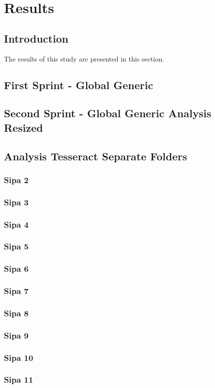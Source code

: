 \chapter{Results}
\label{chap:results}

\section{Introduction}

The results of this study are presented in this section.

\section{First Sprint - Global Generic}
\section{Second Sprint - Global Generic Analysis Resized}
\section{Analysis Tesseract Separate Folders}



\newpage

\newpage

\subsection{Sipa 2}
\subsection{Sipa 3}
\subsection{Sipa 4}
\subsection{Sipa 5}
\subsection{Sipa 6}
\subsection{Sipa 7}
\subsection{Sipa 8}
\subsection{Sipa 9}
\subsection{Sipa 10}
\subsection{Sipa 11}

